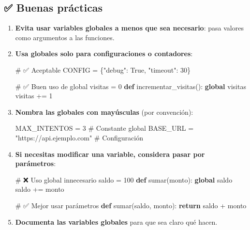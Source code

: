 \documentclass[
  doc,
  floatsintext,
  longtable,
  a4paper,
  nolmodern,
  notxfonts,
  notimes,
  12pt,
  colorlinks=true,linkcolor=blue,citecolor=blue,urlcolor=blue]{apa7}
\newenvironment{Shaded}{\begin{snugshade}}{\end{snugshade}}
\newcommand{\CommentTok}[1]{\textcolor[rgb]{0.37,0.37,0.37}{#1}}
\newcommand{\ControlFlowTok}[1]{\textcolor[rgb]{0.00,0.23,0.31}{\textbf{#1}}}
\newcommand{\DecValTok}[1]{\textcolor[rgb]{0.68,0.00,0.00}{#1}}
\newcommand{\KeywordTok}[1]{\textcolor[rgb]{0.00,0.23,0.31}{\textbf{#1}}}
\newcommand{\NormalTok}[1]{\textcolor[rgb]{0.00,0.23,0.31}{#1}}
\newcommand{\OperatorTok}[1]{\textcolor[rgb]{0.37,0.37,0.37}{#1}}
\newcommand{\StringTok}[1]{\textcolor[rgb]{0.13,0.47,0.30}{#1}}
\newcommand{\VariableTok}[1]{\textcolor[rgb]{0.07,0.07,0.07}{#1}}
\begin{document}
\subsection{✅ Buenas prácticas}\label{buenas-pruxe1cticas}

\begin{enumerate}
\def\labelenumi{\arabic{enumi}.}
\item
  \textbf{Evita usar variables globales a menos que sea necesario}: pasa
  valores como argumentos a las funciones.
\item
  \textbf{Usa globales solo para configuraciones o contadores}:

\begin{Shaded}
\begin{Highlighting}[]
\CommentTok{\# ✅ Aceptable}
\NormalTok{CONFIG }\OperatorTok{=}\NormalTok{ \{}\StringTok{"debug"}\NormalTok{: }\VariableTok{True}\NormalTok{, }\StringTok{"timeout"}\NormalTok{: }\DecValTok{30}\NormalTok{\}}

\CommentTok{\# ✅ Buen uso de global}
\NormalTok{visitas }\OperatorTok{=} \DecValTok{0}
\KeywordTok{def}\NormalTok{ incrementar\_visitas():}
    \KeywordTok{global}\NormalTok{ visitas}
\NormalTok{    visitas }\OperatorTok{+=} \DecValTok{1}
\end{Highlighting}
\end{Shaded}
\item
  \textbf{Nombra las globales con mayúsculas} (por convención):

\begin{Shaded}
\begin{Highlighting}[]
\NormalTok{MAX\_INTENTOS }\OperatorTok{=} \DecValTok{3}  \CommentTok{\# Constante global}
\NormalTok{BASE\_URL }\OperatorTok{=} \StringTok{"https://api.ejemplo.com"}  \CommentTok{\# Configuración}
\end{Highlighting}
\end{Shaded}
\item
  \textbf{Si necesitas modificar una variable, considera pasar por
  parámetros}:

\begin{Shaded}
\begin{Highlighting}[]
\CommentTok{\# ❌ Uso global innecesario}
\NormalTok{saldo }\OperatorTok{=} \DecValTok{100}
\KeywordTok{def}\NormalTok{ sumar(monto):}
    \KeywordTok{global}\NormalTok{ saldo}
\NormalTok{    saldo }\OperatorTok{+=}\NormalTok{ monto}

\CommentTok{\# ✅ Mejor usar parámetros}
\KeywordTok{def}\NormalTok{ sumar(saldo, monto):}
    \ControlFlowTok{return}\NormalTok{ saldo }\OperatorTok{+}\NormalTok{ monto}
\end{Highlighting}
\end{Shaded}
\item
  \textbf{Documenta las variables globales} para que sea claro qué
  hacen.
\end{enumerate}
\end{document}
